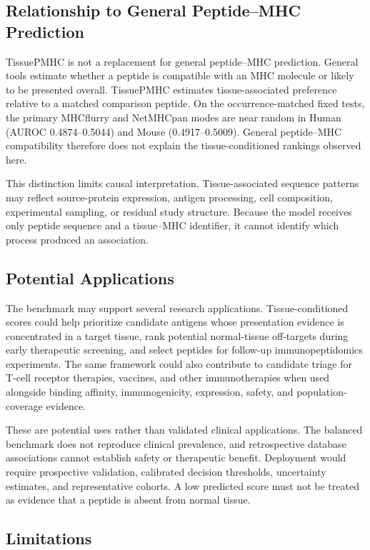 \subsection{Relationship to General Peptide--MHC Prediction}

TissuePMHC is not a replacement for general peptide--MHC prediction. General tools estimate whether a peptide is compatible with an MHC molecule or likely to be presented overall. TissuePMHC estimates tissue-associated preference relative to a matched comparison peptide. On the occurrence-matched fixed tests, the primary MHCflurry and NetMHCpan modes are near random in Human (AUROC 0.4874--0.5044) and Mouse (0.4917--0.5009). General peptide--MHC compatibility therefore does not explain the tissue-conditioned rankings observed here.

This distinction limits causal interpretation. Tissue-associated sequence patterns may reflect source-protein expression, antigen processing, cell composition, experimental sampling, or residual study structure. Because the model receives only peptide sequence and a tissue--MHC identifier, it cannot identify which process produced an association.

\subsection{Potential Applications}

The benchmark may support several research applications. Tissue-conditioned scores could help prioritize candidate antigens whose presentation evidence is concentrated in a target tissue, rank potential normal-tissue off-targets during early therapeutic screening, and select peptides for follow-up immunopeptidomics experiments. The same framework could also contribute to candidate triage for T-cell receptor therapies, vaccines, and other immunotherapies when used alongside binding affinity, immunogenicity, expression, safety, and population-coverage evidence.

These are potential uses rather than validated clinical applications. The balanced benchmark does not reproduce clinical prevalence, and retrospective database associations cannot establish safety or therapeutic benefit. Deployment would require prospective validation, calibrated decision thresholds, uncertainty estimates, and representative cohorts. A low predicted score must not be treated as evidence that a peptide is absent from normal tissue.

\subsection{Limitations}

